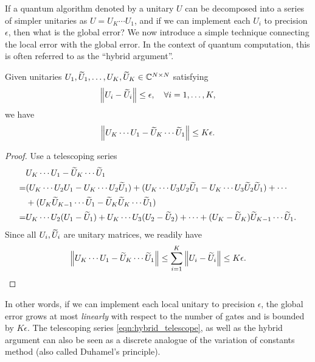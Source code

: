 If a quantum algorithm denoted by a unitary $U$ can be decomposed into a series of simpler unitaries as $U=U_{K}\cdots U_1$, and if we can implement each $U_i$ to precision $\epsilon$, then what is the global error?
We now introduce a simple technique connecting the local error with the global error. 
In the context of quantum computation, this is often referred to as the ``hybrid argument''.

\begin{prop}
Given unitaries $U_1,\widetilde{U}_1,\ldots, U_K,\widetilde{U}_K\in\mathbb{C}^{N\times N}$ satisfying
\begin{equation}
\left\lVert U_i-\widetilde{U}_i\right\rVert\le \epsilon, \quad \forall i=1,\ldots,K,
\end{equation}
we have
\begin{equation}
\left\lVert U_{K}\cdots U_1-\widetilde{U}_K \cdots \widetilde{U}_1\right\rVert\le K \epsilon.
\end{equation}
\label{prop:hybridization_argument}
\end{prop}
\begin{proof}
Use a telescoping series
\begin{equation}
\begin{split}
&U_{K}\cdots U_1-\widetilde{U}_K \cdots \widetilde{U}_1\\
=&(U_{K}\cdots U_2U_1-U_K \cdots U_2\widetilde{U}_1)+
(U_{K}\cdots U_3 U_2\widetilde{U}_1-U_{K}\cdots U_3 \widetilde{U}_2 \widetilde{U}_1)+\cdots\\
&+(U_K\widetilde{U}_{K-1} \cdots \widetilde{U}_1-\widetilde{U}_K\widetilde{U}_K \cdots \widetilde{U}_1)\\
=& U_{K}\cdots U_2(U_1-\widetilde{U}_1)+U_{K}\cdots U_3(U_2-\widetilde{U}_2)+\cdots+(U_K-\widetilde{U}_K)\widetilde{U}_{K-1} \cdots \widetilde{U}_1.
\end{split}
\label{eqn:hybrid_telescope}
\end{equation}
Since all $U_i,\widetilde{U}_i$ are unitary matrices, we readily have
\begin{equation}
\left\lVert U_{K}\cdots U_1-\widetilde{U}_K \cdots \widetilde{U}_1\right\rVert\le \sum_{i=1}^K \left\lVert U_i-\widetilde{U}_i\right\rVert\le K\epsilon.
\end{equation}
\end{proof}

In other words, if we can implement each local unitary to precision $\epsilon$, the global error grows at most \textit{linearly} with respect to the number of gates and is bounded by $K\epsilon$.
The telescoping series \cref{eqn:hybrid_telescope}, as well as the hybrid argument can also be seen as a discrete analogue of the variation of constants method (also called Duhamel's principle).

